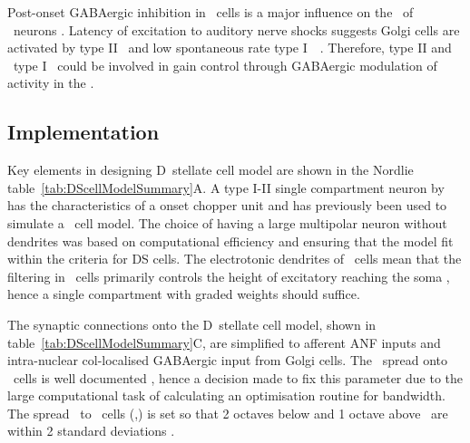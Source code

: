 
Post-onset GABAergic inhibition in \DS~cells is a major influence on the \PSTH~of \OnC~neurons \citep{FerragamoGoldingEtAl:1998a,EvansZhao:1998}.
Latency of excitation to auditory nerve shocks suggests Golgi cells are activated by type II \ANFs~and low spontaneous rate type I~\ANFs~\citep{BensonBerglundEtAl:1996,FerragamoGoldingEtAl:1998}.
Therefore, type II and \LSR~type I \ANFs~could be involved in gain control through GABAergic modulation of activity in the \VCN.






\subsection{Implementation}


Key elements in designing D~stellate cell model are shown in the Nordlie table~\ref{tab:DScellModelSummary}A.
A type I-II single compartment neuron by \citet{RothmanManis:2003b} has the characteristics of a onset chopper unit and has previously been used to simulate a \DS~cell model.
The choice of having a large multipolar neuron without dendrites was based on computational efficiency and ensuring that the model fit within the criteria for DS cells.
The electrotonic dendrites of \DS~cells mean that the filtering in \DS~cells primarily controls the height of excitatory {\PSPs} reaching the soma \citep{WhiteYoungEtAl:1994}, hence a single compartment with graded weights should suffice.



The synaptic connections onto the D~stellate cell model, shown in table~\ref{tab:DScellModelSummary}C, are simplified to afferent ANF inputs and intra-nuclear col-localised GABAergic input from Golgi cells.
The \ANF~spread onto \DS~cells is well documented \citep{PaoliniClark:1999,ArnottWallaceEtAl:2004,PalmerWallaceEtAl:2003,JiangPalmerEtAl:1996,PalmerJiangEtAl:1996}, hence a decision made to fix this parameter due to the large computational task of calculating an optimisation routine for \ANFDS bandwidth.
The spread \ANF~to \DS~cells (\sANFDSh,\sANFDSl) is set so that 2 octaves below and 1 octave above \CF~are within 2 standard deviations \citep{PaoliniClark:1999}.

